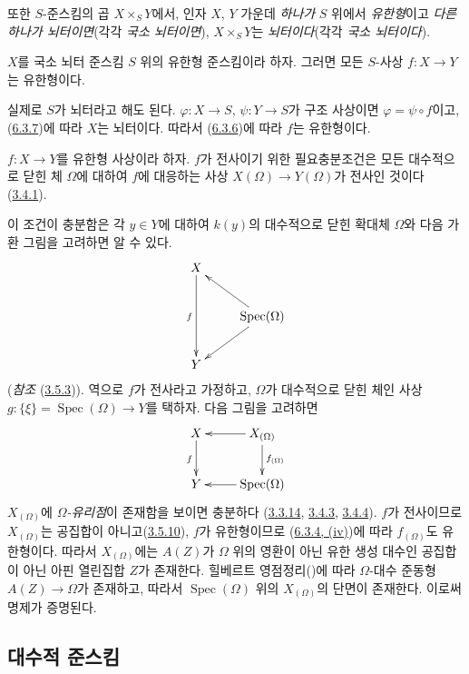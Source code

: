 또한 $S$-준스킴의 곱 $X\times_S Y$에서, 인자 $X$, $Y$ 가운데
\emph{하나가}
$S$ 위에서 \emph{유한형}이고
\emph{다른 하나가 뇌터이면}(각각 \emph{국소 뇌터이면}),
$X\times_S Y$는 \emph{뇌터이다}(각각 \emph{국소 뇌터이다}).

\begin{corollary}[6.3.9]
\label{I.6.3.9-ko}
$X$를 국소 뇌터 준스킴 $S$ 위의 유한형 준스킴이라 하자. 그러면 모든
$S$-사상 $f:X\to Y$는 유한형이다.
\end{corollary}

실제로 $S$가 뇌터라고 해도 된다. $\varphi:X\to S$,
$\psi:Y\to S$가 구조 사상이면 $\varphi=\psi\circ f$이고,
(\hyperref[I.6.3.7-ko]{6.3.7})에 따라 $X$는 뇌터이다. 따라서
(\hyperref[I.6.3.6-ko]{6.3.6})에 따라 $f$는 유한형이다.

\begin{proposition}[6.3.10]
\label{I.6.3.10-ko}
$f:X\to Y$를 유한형 사상이라 하자. $f$가 전사이기 위한 필요충분조건은
모든 대수적으로 닫힌 체 $\Omega$에 대하여 $f$에 대응하는 사상
$X(\Omega)\to Y(\Omega)$가 전사인 것이다
(\hyperref[I.3.4.1-ko]{3.4.1}).
\end{proposition}

이 조건이 충분함은 각 $y\in Y$에 대하여 $k(y)$의 대수적으로 닫힌
확대체 $\Omega$와 다음 가환 그림을 고려하면 알 수 있다.
\[
  \xymatrix{
    X\ar[dd]_f\\
    & \operatorname{Spec}(\Omega)\ar[ul]\ar[dl]\\
    Y
  }
\]
(\emph{참조} (\hyperref[I.3.5.3-ko]{3.5.3})). 역으로 $f$가 전사라고
가정하고, $\Omega$가 대수적으로 닫힌 체인 사상
$g:\{\xi\}=\operatorname{Spec}(\Omega)\to Y$를 택하자. 다음 그림을
고려하면
\[
  \xymatrix{
    X\ar[d]_f &
    X_{(\Omega)}\ar[l]\ar[d]^{f_{(\Omega)}}\\
    Y &
    \operatorname{Spec}(\Omega)\ar[l]
  }
\]
$X_{(\Omega)}$에 \emph{$\Omega$-유리점}이 존재함을 보이면 충분하다
(\hyperref[I.3.3.14-ko]{3.3.14}, \hyperref[I.3.4.3-ko]{3.4.3},
\hyperref[I.3.4.4-ko]{3.4.4}). $f$가 전사이므로 $X_{(\Omega)}$는
공집합이 아니고(\hyperref[I.3.5.10-ko]{3.5.10}), $f$가 유한형이므로
(\hyperref[I.6.3.4-ko]{6.3.4, (iv)})에 따라 $f_{(\Omega)}$도 유한형이다.
따라서 $X_{(\Omega)}$에는 $A(Z)$가 $\Omega$ 위의 영환이 아닌 유한 생성
대수인 공집합이 아닌 아핀 열린집합 $Z$가 존재한다. 힐베르트
영점정리(\cite{I-21})에 따라 $\Omega$-대수 준동형
$A(Z)\to\Omega$가 존재하고, 따라서 $\operatorname{Spec}(\Omega)$ 위의
$X_{(\Omega)}$의 단면이 존재한다. 이로써 명제가 증명된다.

\subsection{대수적 준스킴}
\label{subsection:I.6.4-ko}

